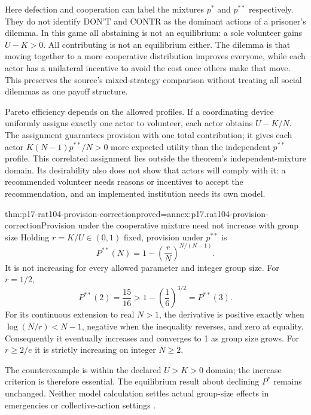 Here defection and cooperation can label the mixtures \(p^*\) and
\(p^{**}\) respectively. They do not identify \(\text{DON'T}\) and
\(\mathrm{CONTR}\) as the dominant actions of a prisoner's dilemma.
In this game all abstaining is not an equilibrium: a sole volunteer gains
\(U-K>0\). All contributing is not an equilibrium either. The dilemma is
that moving together to a more cooperative distribution improves everyone,
while each actor has a unilateral incentive to avoid the cost once others
make that move. This preserves the source's mixed-strategy comparison
without treating all social dilemmas as one payoff structure.

Pareto efficiency depends on the allowed profiles. If a coordinating device
uniformly assigns exactly one actor to volunteer, each actor obtains
\(U-K/N\). The assignment guarantees provision with one total contribution;
it gives each actor \(K(N-1)p^{**}/N>0\) more expected utility than the
independent \(p^{**}\) profile. This correlated assignment lies outside
the theorem's independent-mixture domain. Its desirability also does not
show that actors will comply with it: a recommended volunteer needs reasons
or incentives to accept the recommendation, and an implemented institution
needs its own model.

\begin{hbtheorem}{thm:p17-rat104-provision-correction}{proved=annex:p17.rat104-provision-correction}{Provision under the cooperative mixture need not increase with group size}
Holding \(r=K/U\in(0,1)\) fixed, provision under \(p^{**}\) is
\[
 P^{**}(N)=1-\left(\frac rN\right)^{N/(N-1)}.
\]
It is not increasing for every allowed parameter and integer group size.
For \(r=1/2\),
\[
 P^{**}(2)=\frac{15}{16}
   >1-\left(\frac16\right)^{3/2}=P^{**}(3).
\]
For its continuous extension to real \(N>1\), the derivative is positive
exactly when \(\log(N/r)<N-1\), negative when the inequality reverses,
and zero at equality. Consequently it eventually increases and converges
to 1 as group size grows. For \(r\geq2/e\) it is strictly increasing
on integer \(N\geq2\).
\end{hbtheorem}

The counterexample is within the declared \(U>K>0\) domain;
the increase criterion is therefore essential. The equilibrium result about declining \(P^*\)
remains unchanged. Neither model calculation settles actual group-size
effects in emergencies or collective-action settings
\parencite[pp.~614--615, note~5 on p.~620]{Raub2021RationalChoiceSocialSciences}.

